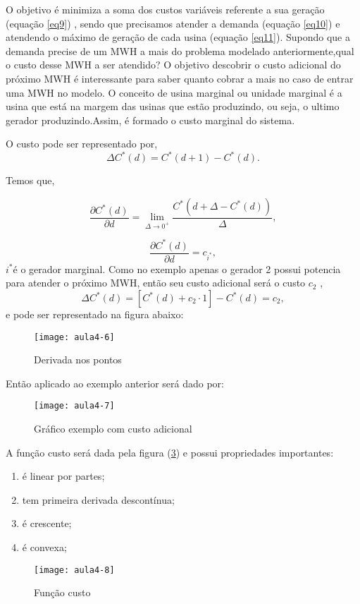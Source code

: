 O objetivo é minimiza a soma dos custos variáveis referente a sua geração (equação \ref{eq9}) , sendo que precisamos atender a demanda (equação \ref{eq10}) e atendendo o máximo de geração de cada usina (equação \ref{eq11}).
Supondo que a demanda precise de um MWH a mais do problema modelado anteriormente,qual o custo desse MWH a ser atendido?
O objetivo descobrir o custo adicional do próximo MWH é interessante
para saber quanto cobrar a mais no caso de entrar uma MWH no modelo.
O conceito de usina marginal ou unidade marginal é a usina que está na
margem das usinas que estão produzindo, ou seja, o ultimo gerador
produzindo.Assim, é formado o custo marginal do sistema.

O custo pode ser representado por,
\[
\Delta C^{*}(d)=C^{*}(d+1)-C^{*}(d).
\]

Temos que,

\[
\frac{\partial C^{*}(d)}{\partial d}=\lim_{\Delta\rightarrow0^{+}}\frac{C^{*}(d+\Delta-C^{*}(d))}{\Delta} ,
\]


\[
\frac{\partial C^{*}(d)}{\partial d}=c_{i^{*}},
\]
$i^{*}$é o gerador marginal.
Como no exemplo apenas o gerador 2 possui potencia para atender o
próximo MWH, então seu custo adicional será o custo $c_{2}$ ,\[
\Delta C^{*}(d)=[C^{*}(d)+c_{2}\cdot1]-C^{*}(d)=c_{2},
\]
 e pode ser representado na figura abaixo:

\begin{figure}[H]
\begin{centering}
\texttt{[image: aula4-6]}\protect\caption{\label{fig:aula4-6} Derivada nos pontos}
\end{centering}
\end{figure}
Então aplicado ao exemplo anterior será dado por:
\begin{figure}[H]
\begin{centering}
\texttt{[image: aula4-7]}\protect\caption{\label{fig:aula4-7} Gráfico exemplo com custo adicional}
\end{centering}
\end{figure}
A função custo será dada pela figura (\ref{fig:aula4-8}) e possui propriedades importantes:
\begin{enumerate}
\item é linear por partes;
\item tem primeira derivada descontínua;
\item é crescente;
\item é convexa;
\end{enumerate}
\begin{figure}[H]
\begin{centering}
\texttt{[image: aula4-8]}\protect\caption{\label{fig:aula4-8} Função custo}
\end{centering}
\end{figure}
